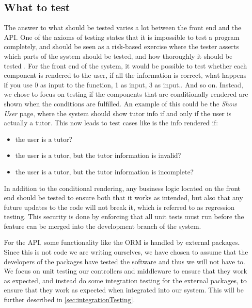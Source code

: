 \subsection{What to test}
The answer to what should be tested varies a lot between the front end and the API.
One of the axioms of testing states that it is impossible to test a program completely, and should be seen as a risk-based exercise where the tester asserts which parts of the system should be tested, and how thoroughly it should be tested \cite{SoftwareTesting}.
For the front end of the system, it would be possible to test whether each component is rendered to the user, if all the information is correct, what happens if you use 0 as input to the function, 1 as input, 3 as input.. And so on.
Instead, we chose to focus on testing if the components that are conditionally rendered are shown when the conditions are fulfilled.
An example of this could be the \textit{Show User} page, where the system should show tutor info if and only if the user is actually a tutor.
This now leads to test cases like is the info rendered if:
\begin{itemize}
    \item the user is a tutor?
    \item the user is a tutor, but the tutor information is invalid?
    \item the user is a tutor, but the tutor information is incomplete?
\end{itemize}

In addition to the conditional rendering, any business logic located on the front end should be tested to ensure both that it works as intended, but also that any future updates to the code will not break it, which is referred to as regression testing.
This security is done by enforcing that all unit tests must run before the feature can be merged into the development branch of the system.

For the API, some functionality like the ORM is handled by external packages.
Since this is not code we are writing ourselves, we have chosen to assume that the developers of the packages have tested the software and thus we will not have to.
We focus on unit testing our controllers and middleware to ensure that they work as expected, and instead do some integration testing for the external packages, to ensure that they work as expected when integrated into our system.
This will be further described in \autoref{sec:integrationTesting}.

